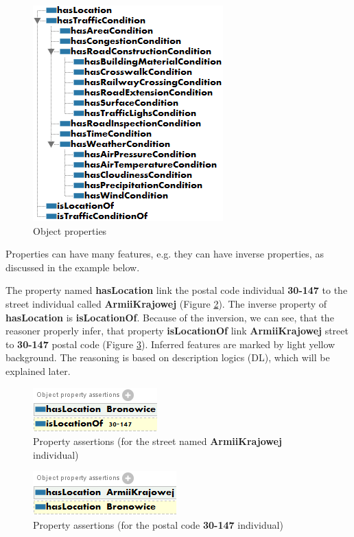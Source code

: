 \begin{figure}[htp]
\centering
\includegraphics[scale=0.7]{images/chapter3/ObjectProperties}
\caption{Object properties}
\label{fig:objectProperties}
\end{figure}

\noindent Properties can have many features, e.g. they can have inverse properties, as discussed in the example below.

\bigskip

\noindent The property named \textbf{hasLocation} link the postal code individual \textbf{30-147} to the street individual called \textbf{ArmiiKrajowej} (Figure \ref{fig:armiiKrajowej}). The inverse property of \textbf{hasLocation} is \textbf{isLocationOf}. Because of the inversion, we can see, that the reasoner properly infer, that property \textbf{isLocationOf} link \textbf{ArmiiKrajowej} street to \textbf{30-147} postal code (Figure \ref{fig:30-147}). Inferred features are marked by light yellow background. The reasoning is based on description logics (DL), which will be explained later.

\medskip

\begin{figure}[htp]
\centering
\includegraphics[scale=0.7]{images/chapter3/ArmiiKrajowej}
\caption{Property assertions (for the street named \textbf{ArmiiKrajowej} individual)}
\label{fig:armiiKrajowej}
\end{figure}

\begin{figure}[htp]
\centering
\includegraphics[scale=0.7]{images/chapter3/30-147}
\caption{Property assertions (for the postal code \textbf{30-147} individual)}
\label{fig:30-147}
\end{figure}

